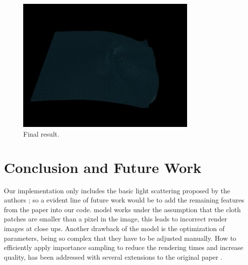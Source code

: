 \documentclass[12pt]{article}
\begin{document}
\begin{figure}[htbp!]
\centering
\includegraphics[width=0.8\textwidth]{images/full_model}
	\caption{Final result.}
	\label{fig:full_model}
\end{figure}

\FloatBarrier
\section{Conclusion and Future Work}

Our implementation only includes the basic light scattering proposed by the authors \cite{Sadeghi2013}; so a evident line of future work would be to add the remaining features from the paper into our code.
\citeauthor{Sadeghi2013} model works under the assumption that the cloth patches are smaller than a pixel in the image, this leads to incorrect render images at close ups.
Another drawback of the model is the optimization of parameters, being so complex that they have to be adjusted manually.
How to efficiently apply importance sampling to reduce the rendering times and increase quality, has been addressed with several extensions to the original paper \cite{Wang2014, Mizutani2014}.




\newpage


\end{document}
